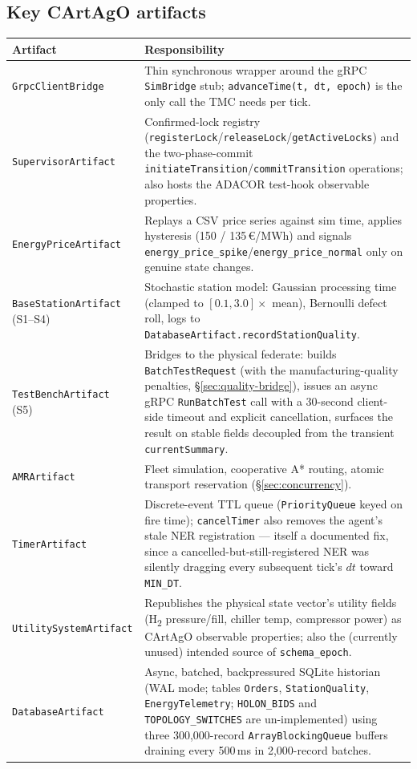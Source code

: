 \documentclass[twocolumn,10pt,a4paper]{article}
\newcommand{\code}[1]{\texttt{\small #1}}
\begin{document}
\subsection{Key CArtAgO artifacts}
\begin{table}[t]
\centering
\small
\begin{tabular}{@{}p{3.6cm}p{12.9cm}@{}}
\toprule
\textbf{Artifact} & \textbf{Responsibility} \\
\midrule
\code{GrpcClientBridge} & Thin synchronous wrapper around the gRPC \code{SimBridge} stub; \code{advanceTime(t, dt, epoch)} is the only call the TMC needs per tick. \\
\code{SupervisorArtifact} & Confirmed-lock registry (\code{registerLock}/\code{releaseLock}/\code{getActiveLocks}) and the two-phase-commit \code{initiateTransition}/\code{commitTransition} operations; also hosts the ADACOR test-hook observable properties. \\
\code{EnergyPriceArtifact} & Replays a CSV price series against sim time, applies hysteresis (150 / 135\,€/MWh) and signals \code{energy\_price\_spike}/\code{energy\_price\_normal} only on genuine state changes. \\
\code{BaseStationArtifact} (S1--S4) & Stochastic station model: Gaussian processing time (clamped to $[0.1,3.0]\times$ mean), Bernoulli defect roll, logs to \code{DatabaseArtifact.recordStationQuality}. \\
\code{TestBenchArtifact} (S5) & Bridges to the physical federate: builds \code{BatchTestRequest} (with the manufacturing-quality penalties, \S\ref{sec:quality-bridge}), issues an async gRPC \code{RunBatchTest} call with a 30-second client-side timeout and explicit cancellation, surfaces the result on stable fields decoupled from the transient \code{currentSummary}. \\
\code{AMRArtifact} & Fleet simulation, cooperative A* routing, atomic transport reservation (\S\ref{sec:concurrency}). \\
\code{TimerArtifact} & Discrete-event TTL queue (\code{PriorityQueue} keyed on fire time); \code{cancelTimer} also removes the agent's stale NER registration --- itself a documented fix, since a cancelled-but-still-registered NER was silently dragging every subsequent tick's $dt$ toward \code{MIN\_DT}. \\
\code{UtilitySystemArtifact} & Republishes the physical state vector's utility fields (H\textsubscript{2} pressure/fill, chiller temp, compressor power) as CArtAgO observable properties; also the (currently unused) intended source of \code{schema\_epoch}. \\
\code{DatabaseArtifact} & Async, batched, backpressured SQLite historian (WAL mode; tables \code{Orders}, \code{StationQuality}, \code{EnergyTelemetry}; \code{HOLON\_BIDS} and \code{TOPOLOGY\_SWITCHES} are un-implemented) using three 300,000-record \code{ArrayBlockingQueue} buffers draining every 500\,ms in 2,000-record batches. \\
\bottomrule
\end{tabular}
\end{table}
\end{document}
